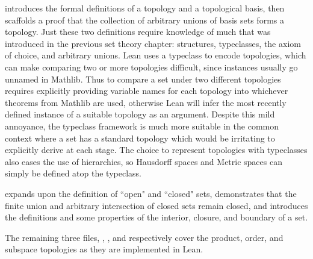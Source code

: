  introduces the formal definitions of a topology and a 
topological basis, then scaffolds a proof that the collection of arbitrary
unions of basis sets forms a topology. Just these two definitions require 
knowledge of much that was introduced in the previous set theory chapter:
structures, typeclasses, the axiom of choice, and arbitrary unions. Lean
uses a typeclass  to encode topologies, which can 
make comparing two or more topologies difficult, since instances usually
go unnamed in Mathlib. Thus to compare a set under two different topologies
requires explicitly providing variable names for each topology into whichever
theorems from Mathlib are used, otherwise Lean will infer the most recently 
defined instance of a suitable topology as an argument. Despite this mild 
annoyance, the typeclass framework is much more suitable in the common context 
where a set has a standard topology which would be irritating to explicitly 
derive at each stage. The choice to represent topologies with typeclasses also 
eases the use of hierarchies, so Hausdorff spaces and Metric spaces can 
simply be defined atop the  typeclass.

 expands upon the definition of ``open" and ``closed" sets, 
demonstrates that the finite union and arbitrary intersection of closed sets
remain closed, and introduces the definitions and some properties of the 
interior, closure, and boundary of a set.

The remaining three files, , ,
and  respectively cover the product, order, 
and subspace topologies as they are implemented in Lean. 